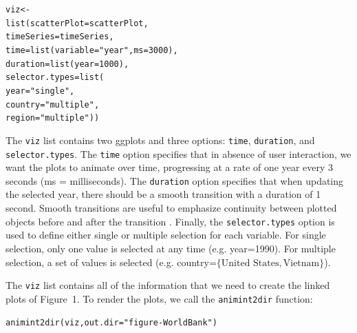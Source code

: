 \documentclass[journal]{vgtc}\usepackage[]{graphicx}\usepackage[]{color}
\makeatletter
\newcommand{\hlnum}[1]{\textcolor[rgb]{0,0,0}{#1}}%
\newcommand{\hlstr}[1]{\textcolor[rgb]{0.502,0,0}{#1}}%
\newcommand{\hlstd}[1]{\textcolor[rgb]{0,0,0}{#1}}%
\newcommand{\hlkwb}[1]{\textcolor[rgb]{0,0,0}{#1}}%
\newcommand{\hlkwc}[1]{\textcolor[rgb]{0,0,1}{#1}}%
\newcommand{\hlkwd}[1]{\textcolor[rgb]{0,0,0}{#1}}%
\newenvironment{kframe}{%
 \def\at@end@of@kframe{}%
 \ifinner\ifhmode%
  \def\at@end@of@kframe{\end{minipage}}%
  \begin{minipage}{\columnwidth}%
 \fi\fi%
 \def\FrameCommand##1{\hskip\@totalleftmargin \hskip-\fboxsep
 \colorbox{shadecolor}{##1}\hskip-\fboxsep
     \hskip-\linewidth \hskip-\@totalleftmargin \hskip\columnwidth}%
 \MakeFramed {\advance\hsize-\width
   \@totalleftmargin\z@ \linewidth\hsize
   \@setminipage}}%
 {\par\unskip\endMakeFramed%
 \at@end@of@kframe}
\newenvironment{knitrout}{}{} %
\makeatother
\begin{document}
\begin{knitrout}
\color{fgcolor}\begin{kframe}
\begin{alltt}
\hlstd{viz} \hlkwb{<-}
  \hlkwd{list}\hlstd{(}\hlkwc{scatterPlot}\hlstd{=scatterPlot,}
       \hlkwc{timeSeries}\hlstd{=timeSeries,}
       \hlkwc{time}\hlstd{=}\hlkwd{list}\hlstd{(}\hlkwc{variable}\hlstd{=}\hlstr{"year"}\hlstd{,} \hlkwc{ms}\hlstd{=}\hlnum{3000}\hlstd{),}
       \hlkwc{duration}\hlstd{=}\hlkwd{list}\hlstd{(}\hlkwc{year}\hlstd{=}\hlnum{1000}\hlstd{),}
       \hlkwc{selector.types}\hlstd{=}\hlkwd{list}\hlstd{(}
         \hlkwc{year}\hlstd{=}\hlstr{"single"}\hlstd{,}
         \hlkwc{country}\hlstd{=}\hlstr{"multiple"}\hlstd{,}
         \hlkwc{region}\hlstd{=}\hlstr{"multiple"}\hlstd{))}
\end{alltt}
\end{kframe}
\end{knitrout}

The \texttt{viz} list contains two ggplots and three options:
\texttt{time}, \texttt{duration}, and \texttt{selector.types}. The
\texttt{time} option specifies that in absence of user interaction, we
want the plots to animate over time, progressing at a rate of one year
every 3 seconds (ms = milliseconds). The \texttt{duration} option
specifies that when updating the selected year, there should be a
smooth transition with a duration of 1 second. Smooth transitions are
useful to emphasize continuity between plotted objects before and after the
transition \citep{animated-transitions}. Finally, the
\texttt{selector.types} option is used to define either single or
multiple selection for each variable. For single selection, only one
value is selected at any time (e.g. year=1990). For multiple
selection, a set of values is selected (e.g. country=$\{\textrm{United
  States}, \textrm{Vietnam}\}$).

The \texttt{viz} list contains all of the information that we need to
create the linked plots of Figure~1. To render the plots, we call the
\texttt{animint2dir} function:

\begin{knitrout}
\color{fgcolor}\begin{kframe}
\begin{alltt}
\hlkwd{animint2dir}\hlstd{(viz,} \hlkwc{out.dir}\hlstd{=}\hlstr{"figure-WorldBank"}\hlstd{)}
\end{alltt}
\end{kframe}
\end{knitrout}
\end{document}
